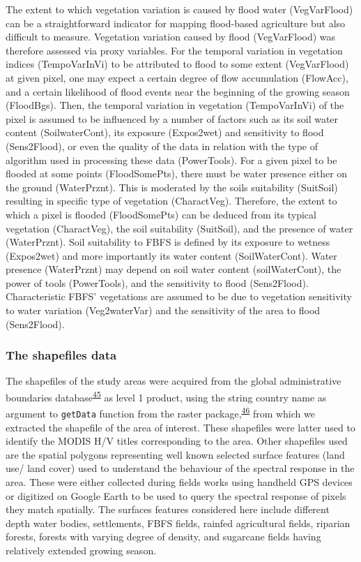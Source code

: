 \documentclass[12pt,oneside]{article}
\begin{document}
The extent to which vegetation variation is caused by flood water (VegVarFlood) can be a straightforward indicator for mapping flood-based agriculture but also difficult to measure. Vegetation variation caused by flood (VegVarFlood) was therefore assessed via proxy variables. For the temporal variation in vegetation indices (TempoVarInVi) to be attributed to flood to some extent (VegVarFlood) at given pixel, one may expect a certain degree of flow accumulation (FlowAcc), and a certain likelihood of flood events near the beginning of the growing season (FloodBgs). Then, the temporal variation in vegetation (TempoVarInVi) of the pixel is assumed to be influenced by a number of factors such as its soil water content (SoilwaterCont), its exposure (Expos2wet) and sensitivity to flood (Sens2Flood), or even the quality of the data in relation with the type of algorithm used in processing these data (PowerTools).
For a given pixel to be flooded at some points (FloodSomePts), there must be water presence either on the ground (WaterPrznt). This is moderated by the soils suitability (SuitSoil) resulting in specific type of vegetation (CharactVeg). Therefore, the extent to which a pixel is flooded (FloodSomePts) can be deduced from its typical vegetation (CharactVeg), the soil suitability (SuitSoil), and the presence of water (WaterPrznt). Soil suitability to FBFS is defined by its exposure to wetness (Expos2wet) and more importantly its water content (SoilWaterCont). Water presence (WaterPrznt) may depend on soil water content (soilWaterCont), the power of tools (PowerTools), and the sensitivity to flood (Sens2Flood). Characteristic FBFS' vegetations are assumed to be due to vegetation sensitivity to water variation (Veg2waterVar) and the sensitivity of the area to flood (Sens2Flood).

\hypertarget{I32}{%
\subsubsection{The shapefiles data}\label{I32}}

The shapefiles of the study areas were acquired from the global administrative boundaries database\textsuperscript{\protect\hyperlink{ref-GADM_2018}{45}} as level 1 product, using the string country name as argument to \texttt{getData} function from the raster package,\textsuperscript{\protect\hyperlink{ref-Hijmans_2019}{46}} from which we extracted the shapefile of the area of interest. These shapefiles were latter used to identify the MODIS H/V titles corresponding to the area. Other shapefiles used are the spatial polygons representing well known selected surface features (land use/ land cover) used to understand the behaviour of the spectral response in the area. These were either collected during fields works using handheld GPS devices or digitized on Google Earth to be used to query the spectral response of pixels they match spatially. The surfaces features considered here include different depth water bodies, settlements, FBFS fields, rainfed agricultural fields, riparian forests, forests with varying degree of density, and sugarcane fields having relatively extended growing season.
\end{document}

